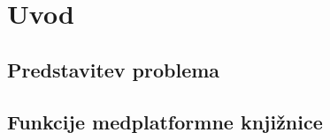 \graphicspath{{img/}}







\chapter{Uvod}
\label{chap:introduction}


\section{Predstavitev problema}

\section{Funkcije medplatformne knjižnice}
